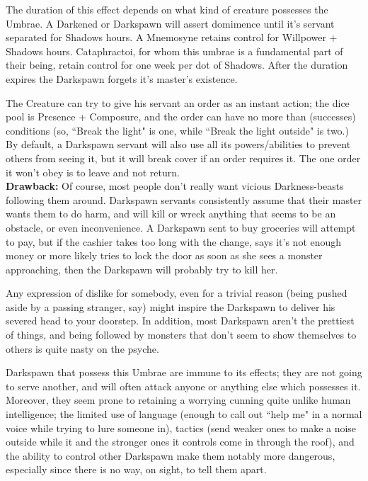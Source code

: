 The duration of this effect depends on what kind of creature possesses the Umbrae. A Darkened or Darkspawn will assert domimence until it's servant separated for Shadows hours. A Mnemosyne retains control for Willpower + Shadows hours. Cataphractoi, for whom this umbrae is a fundamental part of their being, retain control for one week per dot of Shadows. After the duration expires the Darkspawn forgets it's master's existence.

The Creature can try to give his servant an order as an instant action; the dice pool is Presence + Composure, and the order can have no more than (successes) conditions (so, \textquotedblleft Break the light" is one, while \textquotedblleft Break the light outside" is two.) By default, a Darkspawn servant will also use all its powers/abilities to prevent others from seeing it, but it will break cover if an order requires it. The one order it won't obey is to leave and not return. \\

\noindent \textbf{Drawback:} Of course, most people don't really want vicious Darkness-beasts following them around. Darkspawn servants consistently assume that their master wants them to do harm, and will kill or wreck anything that seems to be an obstacle, or even inconvenience. A Darkspawn sent to buy groceries will attempt to pay, but if the cashier takes too long with the change, says it's not enough money or more likely tries to lock the door as soon as she sees a monster approaching, then the Darkspawn will probably try to kill her. 

Any expression of dislike for somebody, even for a trivial reason (being pushed aside by a passing stranger, say) might inspire the Darkspawn to deliver his severed head to your doorstep. In addition, most Darkspawn aren't the prettiest of things, and being followed by monsters that don't seem to show themselves to others is quite nasty on the psyche.

Darkspawn that possess this Umbrae are immune to its effects; they are not going to serve another, and will often attack anyone or anything else which possesses it. Moreover, they seem prone to retaining a worrying cunning quite unlike human intelligence; the limited use of language (enough to call out \textquotedblleft help me" in a normal voice while trying to lure someone in), tactics (send weaker ones to make a noise outside while it and the stronger ones it controls come in through the roof), and the ability to control other Darkspawn make them notably more dangerous, especially since there is no way, on sight, to tell them apart. 

